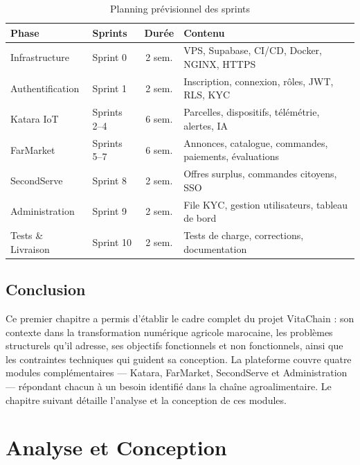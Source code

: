 \documentclass[12pt,a4paper]{report}
\begin{document}
\begin{table}[H]
  \centering
  \caption{Planning prévisionnel des sprints}
  \label{tab:planning}
  \begin{tabularx}{\linewidth}{llcX}
    \toprule
    \textbf{Phase} & \textbf{Sprints} & \textbf{Durée} & \textbf{Contenu} \\
    \midrule
    Infrastructure & Sprint 0   & 2 sem. & VPS, Supabase, CI/CD, Docker, NGINX, HTTPS \\
    Authentification & Sprint 1 & 2 sem. & Inscription, connexion, rôles, JWT, RLS, KYC \\
    Katara IoT  & Sprints 2--4  & 6 sem. & Parcelles, dispositifs, télémétrie, alertes, IA \\
    FarMarket   & Sprints 5--7  & 6 sem. & Annonces, catalogue, commandes, paiements,
                                           évaluations \\
    SecondServe & Sprint 8      & 2 sem. & Offres surplus, commandes citoyens, SSO \\
    Administration & Sprint 9   & 2 sem. & File KYC, gestion utilisateurs, tableau de bord \\
    Tests \& Livraison & Sprint 10 & 2 sem. & Tests de charge, corrections, documentation \\
    \bottomrule
  \end{tabularx}
\end{table}

\section{Conclusion}

Ce premier chapitre a permis d'établir le cadre complet du projet VitaChain : son contexte
dans la transformation numérique agricole marocaine, les problèmes structurels qu'il
adresse, ses objectifs fonctionnels et non fonctionnels, ainsi que les contraintes
techniques qui guident sa conception. La plateforme couvre quatre modules complémentaires
--- Katara, FarMarket, SecondServe et Administration --- répondant chacun à un besoin
identifié dans la chaîne agroalimentaire. Le chapitre suivant détaille l'analyse et la
conception de ces modules.

\chapter{Analyse et Conception}
\end{document}
